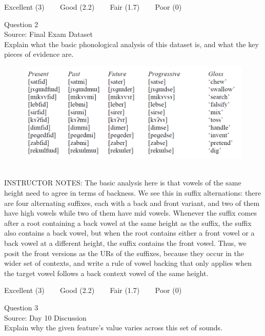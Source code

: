 \documentclass[12pt]{article}
\begin{document}
\vfill
Excellent (3) ~~~ Good (2.2) ~~~ Fair (1.7) ~~~ Poor (0)
\newpage

{\large Question 2}\\

Source: Final Exam Dataset\\

Explain what the basic phonological analysis of this dataset is, and what the key pieces of evidence are.\\

\begin{figure}[H]
\includegraphics{../images/final_dataset.png}
\end{figure}

~\\
INSTRUCTOR NOTES: The basic analysis here is that vowels of the same height need to agree in terms of backness. We see this in suffix alternations: there are four alternating suffixes, each with a back and front variant, and two of them have high vowels while two of them have mid vowels. Whenever the suffix comes after a root containing a back vowel at the same height as the suffix, the suffix also contains a back vowel, but when the root contains either a front vowel or a back vowel at a different height, the suffix contains the front vowel. Thus, we posit the front versions as the URs of the suffixes, because they occur in the wider set of contexts, and write a rule of vowel backing that only applies when the target vowel follows a back context vowel of the same height.


\vfill
Excellent (3) ~~~ Good (2.2) ~~~ Fair (1.7) ~~~ Poor (0)
\newpage

{\large Question 3}\\

Source: Day 10 Discussion\\

Explain why the given feature's value varies across this set of sounds.\\
\end{document}
